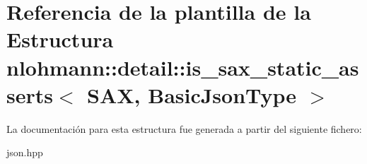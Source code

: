 \hypertarget{structnlohmann_1_1detail_1_1is__sax__static__asserts}{}\section{Referencia de la plantilla de la Estructura nlohmann\+:\+:detail\+:\+:is\+\_\+sax\+\_\+static\+\_\+asserts$<$ S\+AX, Basic\+Json\+Type $>$}
\label{structnlohmann_1_1detail_1_1is__sax__static__asserts}


La documentación para esta estructura fue generada a partir del siguiente fichero\+:\begin{DoxyCompactItemize}
\item 
json.\+hpp\end{DoxyCompactItemize}
